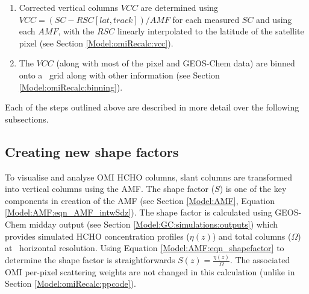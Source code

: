 \begin{enumerate}
\begin{enumerate}
        \item These corrections are binned by satellite detector (track: 1-60), and latitude (0.36\degr; 500 latitudes from 90{\degr}S to 90{\degr}N).
        \item The median entry of each bin is determined and this forms the $RSC[lat,track]$ (e.g., Figure \ref{Model:omiRecalc:RSC:fig_track_correction_interpolations}).
      \end{enumerate}
      \item Corrected vertical columns $VCC$ are determined using $VCC = (SC - RSC[lat,track] )/AMF$ for each measured $SC$ and using each $AMF$, with the $RSC$ linearly interpolated to the latitude of the satellite pixel (see Section \ref{Model:omiRecalc:vcc}).
      \item The $VCC$ (along with most of the pixel and GEOS-Chem data) are binned onto a \highhr ~grid along with other information (see Section \ref{Model:omiRecalc:binning}).
    \end{enumerate}
 
    Each of the steps outlined above are described in more detail over the following subsections.
    
  
  \subsection{Creating new shape factors}
    \label{Model:omiRecalc:shape_factors}
    To visualise and analyse OMI HCHO columns, slant columns are transformed into vertical columns using the AMF.
    The shape factor ($S$) is one of the key components in creation of the AMF (see Section \ref{Model:AMF}, Equation \ref{Model:AMF:eqn_AMF_intwSdz}).
    The shape factor is calculated using GEOS-Chem midday output (see Section \ref{Model:GC:simulations:outputs}) which provides simulated HCHO concentration profiles ($\eta(z)$) and total columns ($\Omega$) at \lowhr ~horizontal resolution.
    Using Equation \ref{Model:AMF:eqn_shapefactor} to determine the shape factor is straightforwards $S(z) = \frac{\eta(z)}{\Omega}$.
    The associated OMI per-pixel scattering weights are not changed in this calculation (unlike in Section \ref{Model:omiRecalc:ppcode}).
    
